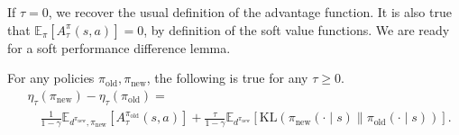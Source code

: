 \documentclass[twoside,11pt]{article}
\newcommand{\Ex}{\mathbb{E}}
\newcommand{\KL}{\mathrm{KL}}
\newcommand{\entropy}{\mathcal{H}}
\newcommand{\pinew}{{\pi_\mathrm{new}}}
\newcommand{\piold}{{\pi_\mathrm{old}}}
\begin{document}
\noindent If $\tau = 0$, we recover the usual definition of the advantage function. It is also true that $\Ex_\pi[A^\pi_\tau(s, a)]= 0$, by definition of the soft value functions. We are ready for a soft performance difference lemma. 
\begin{lemma}\label{lemma:soft-performance-difference}
For any policies $\piold, \pinew$, the following is true for any $\tau \geq 0$.
\begin{align*}
   &\eta_\tau(\pinew) - \eta_\tau(\piold) =\\
      &\quad \frac{1}{1 - \gamma}\Ex_{d^{\pinew}, \pinew}[A_\tau^{\piold}(s, a)] + \frac{\tau}{1 - \gamma} \Ex_{d^\pinew}[\KL(\pinew(\cdot \mid s) \parallel \piold(\cdot \mid s))].
\end{align*}
\end{lemma}
\end{document}

